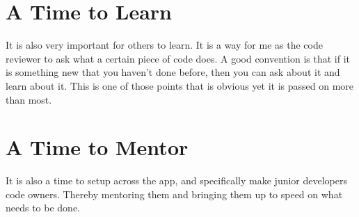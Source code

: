 \section{ A Time to Learn }
It is also very important for others to learn. It is a way for me as the code
reviewer to ask what a certain piece of code does. A good convention is that if
it is something new that you haven't done before, then you can ask about it
and learn about it. This is one of those points that is obvious yet it is passed
on more than most.

\section{ A Time to Mentor }
It is also a time to setup \codeowners{} across the app, and specifically make
junior developers code owners. Thereby mentoring them and bringing them up to
speed on what needs to be done. 
